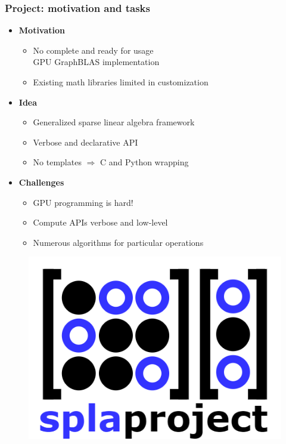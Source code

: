 \documentclass[aspectratio=169,xcolor=table,english]{beamer}
\begin{document}
\begin{frame}[fragile] \frametitle{Project: motivation and tasks}
    \begin{minipage}[m]{0.7\linewidth}
        \begin{itemize}
            \item \textbf{Motivation}
            {
            \begin{itemize}
                \item No complete and ready for usage\\GPU GraphBLAS implementation
                \item Existing math libraries limited in customization
            \end{itemize}
            }
            \item \textbf{Idea}
            {
            \begin{itemize}
                \item Generalized sparse linear algebra framework
                \item Verbose and declarative API
                \item No templates $\Rightarrow$ C and Python wrapping
            \end{itemize}
            }
            \item \textbf{Challenges}
            {
            \begin{itemize}
                \item GPU programming is hard!
                \item Compute APIs verbose and low-level
                \item Numerous algorithms for particular operations
            \end{itemize}
            }
        \end{itemize}
    \end{minipage}\hfill
    \begin{minipage}[m]{0.3\linewidth}
        \begin{figure}
            \centering
            \includegraphics[width=\textwidth]{figures/spla-logo.png}

\end{figure}
\end{minipage}
\end{frame}
\end{document}
